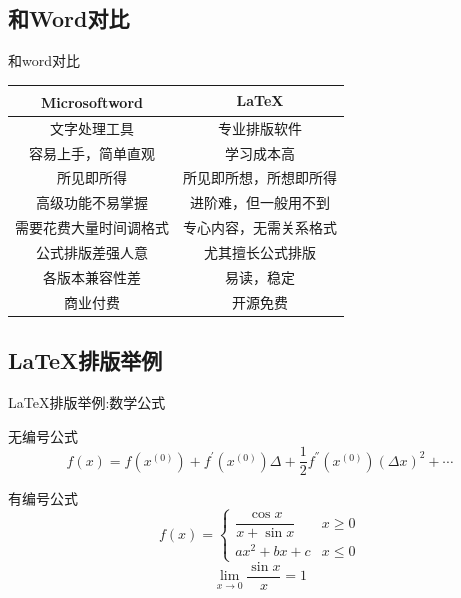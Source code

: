 \documentclass[UTF8,11pt]{ctexbeamer}
\begin{document}
\subsection{和Word对比}
\begin{frame}{和word对比}
	\begin{center}
		\begin{tabular}{c|c}
			\hline
			Microsoft\textsuperscript{\textregistered}word & \LaTeX \\
			\hline
			\rowcolor{black!20}
			文字处理工具			& 专业排版软件  \\
			容易上手，简单直观 	  & 学习成本高   \\
			\rowcolor{gray!40}
			所见即所得			 & 所见即所想，所想即所得  \\
			高级功能不易掌握 	   & 进阶难，但一般用不到  \\
			\rowcolor{gray!40}
			需要花费大量时间调格式	& 专心内容，无需关系格式 \\
			公式排版差强人意	  & 尤其擅长公式排版 \\
			\rowcolor{gray!40}
			各版本兼容性差		  & 易读，稳定 \\
			商业付费			& 开源免费 \\
			\hline
		\end{tabular}	
	\end{center}
\end{frame}





\subsection{\LaTeX 排版举例}\label{eq_example}
\begin{frame}{\LaTeX 排版举例:数学公式}
	\begin{block}{无编号公式}
		$$ f(x)=f(x^{(0)})+f^{'}(x^{(0)})\Delta +\frac{1}{2}f^{''}(x^{(0)})(\Delta x)^2+\cdots$$
	\end{block}
	
	\begin{block}{有编号公式}
		\begin{equation}\label{eq1}
			f(x) = 
			\begin{cases}
			\dfrac{\cos{x}}{x+\sin{x}} & x \geq 0 \\
							ax^2+bx+c & x \leq 0
			\end{cases}
		\end{equation}
		\begin{equation}\label{eq2}
		 \lim_{x \rightarrow 0} \frac{\sin x}{x}=1
		\end{equation}
	\end{block}
\end{frame}
\end{document}
